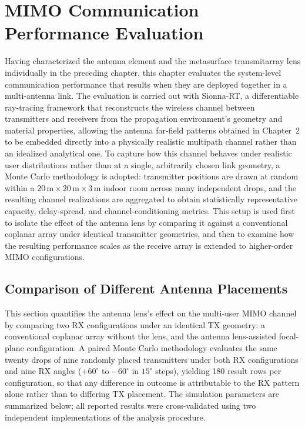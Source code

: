 \chapter{MIMO Communication Performance Evaluation}

Having characterized the antenna element and the metasurface transmitarray lens individually in the preceding chapter, this chapter evaluates the system-level communication performance that results when they are deployed together in a multi-antenna link. The evaluation is carried out with Sionna-RT, a differentiable ray-tracing framework that reconstructs the wireless channel between transmitters and receivers from the propagation environment's geometry and material properties, allowing the antenna far-field patterns obtained in Chapter~2 to be embedded directly into a physically realistic multipath channel rather than an idealized analytical one. To capture how this channel behaves under realistic user distributions rather than at a single, arbitrarily chosen link geometry, a Monte Carlo methodology is adopted: transmitter positions are drawn at random within a $20\,\text{m}\times20\,\text{m}\times3\,\text{m}$ indoor room across many independent drops, and the resulting channel realizations are aggregated to obtain statistically representative capacity, delay-spread, and channel-conditioning metrics. This setup is used first to isolate the effect of the antenna lens by comparing it against a conventional coplanar array under identical transmitter geometries, and then to examine how the resulting performance scales as the receive array is extended to higher-order MIMO configurations.

\section{Comparison of Different Antenna Placements}\label{sec:comparison-antenna-placements}

This section quantifies the antenna lens's effect on the multi-user MIMO channel by comparing two RX configurations under an identical TX geometry: a conventional coplanar array without the lens, and the antenna lens-assisted focal-plane configuration. A paired Monte Carlo methodology evaluates the same twenty drops of nine randomly placed transmitters under both RX configurations and nine RX angles ($+60^\circ$ to $-60^\circ$ in $15^\circ$ steps), yielding 180 result rows per configuration, so that any difference in outcome is attributable to the RX pattern alone rather than to differing TX placement. The simulation parameters are summarized below; all reported results were cross-validated using two independent implementations of the analysis procedure.

